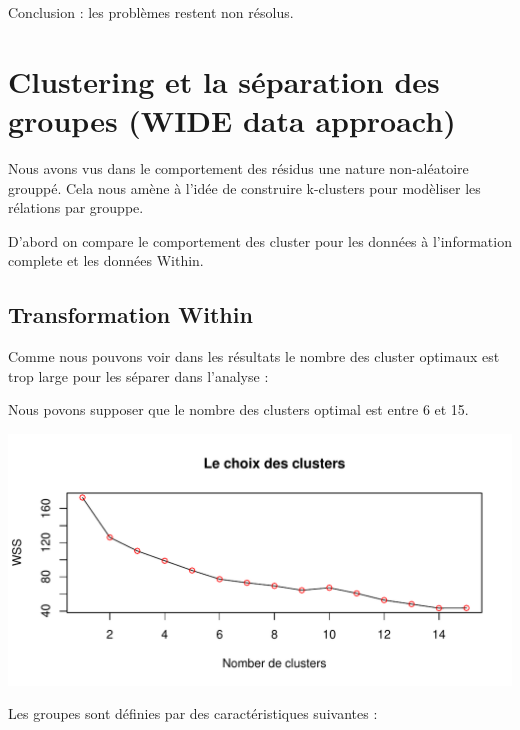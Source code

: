 \documentclass[11pt,]{article}
\begin{document}
Conclusion : les problèmes restent non résolus.

\FloatBarrier

\hypertarget{clustering-et-la-separation-des-groupes-wide-data-approach}{%
\section{Clustering et la séparation des groupes (WIDE data
approach)}\label{clustering-et-la-separation-des-groupes-wide-data-approach}}

Nous avons vus dans le comportement des résidus une nature non-aléatoire
grouppé. Cela nous amène à l'idée de construire k-clusters pour
modèliser les rélations par grouppe.

\par

D'abord on compare le comportement des cluster pour les données à
l'information complete et les données Within.

\hypertarget{transformation-within}{%
\subsection{Transformation Within}\label{transformation-within}}

Comme nous pouvons voir dans les résultats le nombre des cluster
optimaux est trop large pour les séparer dans l'analyse :

\par

Nous povons supposer que le nombre des clusters optimal est entre 6 et
15.

\FloatBarrier

\includegraphics{note2pres_files/figure-latex/unnamed-chunk-87-1.pdf}

\FloatBarrier

Les groupes sont définies par des caractéristiques suivantes :
\end{document}
